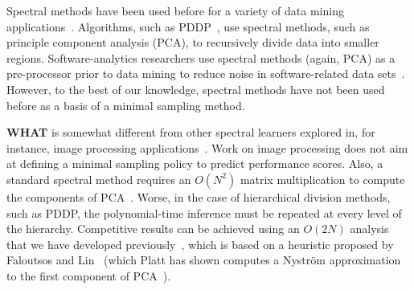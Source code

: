 \documentclass[smallextended]{svjour3}       %
\newcommand{\what}{{\bf WHAT}\xspace}
\begin{document}
Spectral methods have been used before for a variety of data mining applications~\cite{kamvar2003spectral}.
Algorithms, such as PDDP~\cite{boley98}, use spectral methods, such as principle component analysis (PCA), to
recursively divide data into smaller regions.  Software-analytics researchers use spectral methods (again, PCA) as a pre-processor prior to data mining  to reduce noise in software-related data sets~\cite{theisen2015approximating}.
However, to the best of our knowledge, spectral methods have not been used before as a basis of a minimal sampling method.


\what is somewhat different from other spectral
learners explored in, for instance, image processing applications~\cite{shi00}.
Work on image processing does not aim at
defining a minimal sampling policy to predict performance scores.
Also, a standard spectral method requires an $O(N^2)$ matrix multiplication to compute the components
of PCA~\cite{ilin10}. Worse, in the case of hierarchical division methods, such as PDDP,
the polynomial-time inference must be repeated at every level of the hierarchy.
Competitive results can be achieved
using an $O(2N)$ analysis that we have developed previously~\cite{me12d}, which is  based on  a heuristic proposed by Faloutsos and Lin~\cite{Faloutsos1995} (which Platt has shown computes a Nystr\"om approximation to the first component of PCA~\cite{platt05}).
\end{document}
